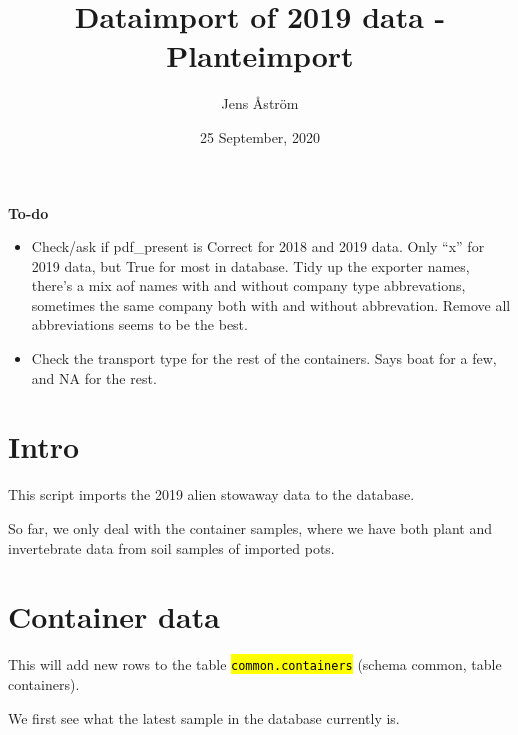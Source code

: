 \documentclass[]{article}
\title{Dataimport of 2019 data - Planteimport}
\author{Jens Åström}
\date{25 September, 2020}
\newenvironment{Shaded}{\begin{snugshade}}{\end{snugshade}}
\newcommand{\DecValTok}[1]{\textcolor[rgb]{0.00,0.00,0.81}{#1}}
\newcommand{\KeywordTok}[1]{\textcolor[rgb]{0.13,0.29,0.53}{\textbf{#1}}}
\newcommand{\NormalTok}[1]{#1}
\newcommand{\OperatorTok}[1]{\textcolor[rgb]{0.81,0.36,0.00}{\textbf{#1}}}
\newcommand{\StringTok}[1]{\textcolor[rgb]{0.31,0.60,0.02}{#1}}
\let\OldTexttt\texttt
\renewcommand{\texttt}[1]{\OldTexttt{\hl{#1}}}
\begin{document}
\maketitle

{
\setcounter{tocdepth}{2}
\tableofcontents
}
\textbf{To-do}

\begin{itemize}
\item
  Check/ask if pdf\_present is Correct for 2018 and 2019 data. Only
  ``x'' for 2019 data, but True for most in database. Tidy up the
  exporter names, there's a mix aof names with and without company type
  abbrevations, sometimes the same company both with and without
  abbrevation. Remove all abbreviations seems to be the best.
\item
  Check the transport type for the rest of the containers. Says boat for
  a few, and NA for the rest.
\end{itemize}

\hypertarget{intro}{%
\section{Intro}\label{intro}}

This script imports the 2019 alien stowaway data to the database.

So far, we only deal with the container samples, where we have both
plant and invertebrate data from soil samples of imported pots.

\hypertarget{container-data}{%
\section{Container data}\label{container-data}}

This will add new rows to the table \texttt{common.containers} (schema
common, table containers).

We first see what the latest sample in the database currently is.

\begin{Shaded}
\end{Shaded}
\end{document}
